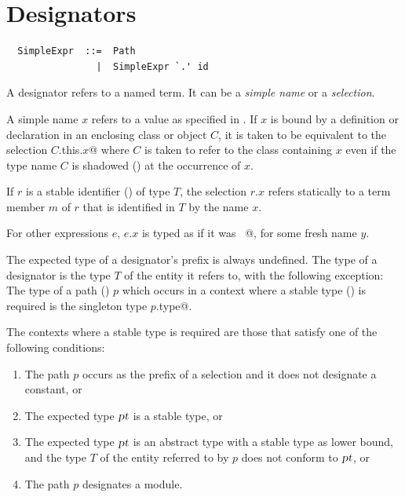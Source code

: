 \section{Designators}
\label{sec:designators}

\syntax\begin{lstlisting}
  SimpleExpr  ::=  Path
                |  SimpleExpr `.' id
\end{lstlisting}

A designator refers to a named term. It can be a {\em simple name} or
a {\em selection}. 

A simple name $x$ refers to a value as specified in .
If $x$ is bound by a definition or declaration in an enclosing class
or object $C$, it is taken to be equivalent to the selection
\lstinline@$C$.this.$x$@ where $C$ is taken to refer to the class containing $x$
even if the type name $C$ is shadowed () at the
occurrence of $x$.

If $r$ is a stable identifier
() of type $T$, the selection $r.x$ refers
statically to a term member $m$ of $r$ that is identified in $T$ by
the name $x$.   

For other expressions $e$, $e.x$ is typed as
if it was ~@, for some fresh name
$y$.  

The expected type of a designator's prefix is always undefined.  The
type of a designator is the type $T$ of the entity it refers to, with
the following exception: The type of a path () $p$
which occurs in a context where a stable type
() is required is the singleton type
\lstinline@$p$.type@.

The contexts where a stable type is required are those that satisfy
one of the following conditions:
\begin{enumerate}
\item
The path $p$ occurs as the prefix of a selection and it does not
designate a constant, or
\item
The expected type $\mbox{\sl pt}$ is a stable type, or
\item
The expected type $\mbox{\sl pt}$ is an abstract type with a stable type as lower
bound, and the type $T$ of the entity referred to by $p$ does not
conform to $\mbox{\sl pt}$, or
\item
The path $p$ designates a module.
\end{enumerate}

